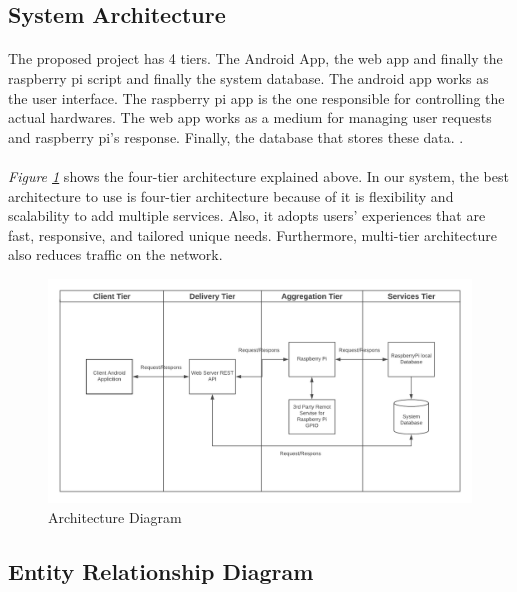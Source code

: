 \documentclass[12pt]{paper}
\begin{document}
	\subsection{System Architecture}
	\paragraph{} The proposed project has 4 tiers. The Android App, the web app and finally the raspberry pi script and finally the system database. The android app works as the user interface. The raspberry pi app is the one responsible for controlling the actual hardwares. The web app  works as a medium for managing user requests and raspberry pi's response. Finally, the database that stores these data.
.
	\paragraph{} \textit{Figure \ref{fig:diagram_architecture}} shows the four-tier architecture explained above. In our system, the best architecture to use is four-tier architecture because of it is flexibility and scalability to add multiple services. Also, it adopts users’ experiences that are fast, responsive, and tailored unique needs. Furthermore, multi-tier architecture also reduces traffic on the network\cite{architecture}.
	\begin{figure}[H]
		\centering
		\includegraphics[width=\linewidth]{img/diagram_architecture.png}
		\caption{Architecture Diagram}
		\label{fig:diagram_architecture}
	\end{figure}

	
	\subsection{Entity Relationship Diagram}
	
\end{document}
